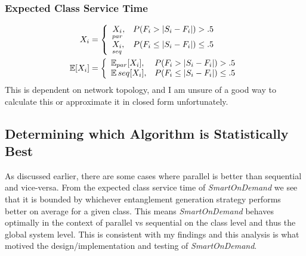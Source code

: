 \subsubsection{Expected Class Service Time}
\begin{align*}
    X_i     & = \left\{\begin{array}{lr}
                           \underset{par}{X_i}, & P(F_i>|S_i-F_i|) > .5       \\
                           \underset{seq}{X_i}, & P(F_i\leq|S_i-F_i|) \leq .5 \\
                       \end{array}\right. \\
    \operatorname*{\mathbb{E}}[X_i] & = \left\{\begin{array}{lr}
                           \operatorname*{\mathbb{E}}_{par}[X_i], & P(F_i>|S_i-F_i|) > .5       \\
                           \operatorname*{\mathbb{E}}{seq}[X_i],  & P(F_i\leq|S_i-F_i|) \leq .5 \\
                       \end{array}\right.       \\
\end{align*}
This is dependent on network topology, and I am unsure of a good way to calculate this or approximate it in closed form unfortunately.
\subsection{Determining which Algorithm is Statistically Best}
As discussed earlier, there are some cases where parallel is better than sequential and vice-versa.
From the expected class service time of \textit{SmartOnDemand} we see that it is bounded by whichever entanglement generation strategy performs better on average for a given class.
This means \textit{SmartOnDemand} behaves optimally in the context of parallel vs sequential on the class level and thus the global system level.
This is consistent with my findings and this analysis is what motived the design/implementation and testing of \textit{SmartOnDemand}.
